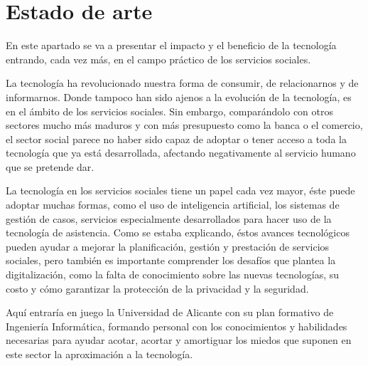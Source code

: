 
\chapter{Estado de arte}
En este apartado se va a presentar el impacto y el beneficio de la tecnología entrando, cada vez más, en el campo práctico de los servicios sociales.
\vspace{1em}
\par La tecnología ha revolucionado nuestra forma de consumir, de relacionarnos y de informarnos. Donde tampoco han sido ajenos a la evolución de la tecnología, es en el ámbito de los servicios sociales. Sin embargo, comparándolo con otros sectores mucho más maduros y con más presupuesto como la banca o el comercio, el sector social parece no haber sido capaz de adoptar o tener acceso a toda la tecnología que ya está desarrollada, afectando negativamente al servicio humano que se pretende dar.
\vspace{1em}
\par La tecnología en los servicios sociales tiene un papel cada vez mayor, éste puede adoptar muchas formas, como el uso de inteligencia artificial, los sistemas de gestión de casos, servicios especialmente desarrollados para hacer uso de la tecnología de asistencia. Como se estaba explicando, éstos avances tecnológicos pueden ayudar a mejorar la planificación, gestión y prestación de servicios sociales, pero también es importante comprender los desafíos que plantea la digitalización, como la falta de conocimiento sobre las nuevas tecnologías, su costo y cómo garantizar la protección de la privacidad y la seguridad.
\vspace{1em}
\par Aquí entraría en juego la Universidad de Alicante con su plan formativo de Ingeniería Informática, formando personal con los conocimientos y habilidades necesarias para ayudar acotar, acortar y amortiguar los miedos que suponen en este sector la aproximación a la tecnología.

